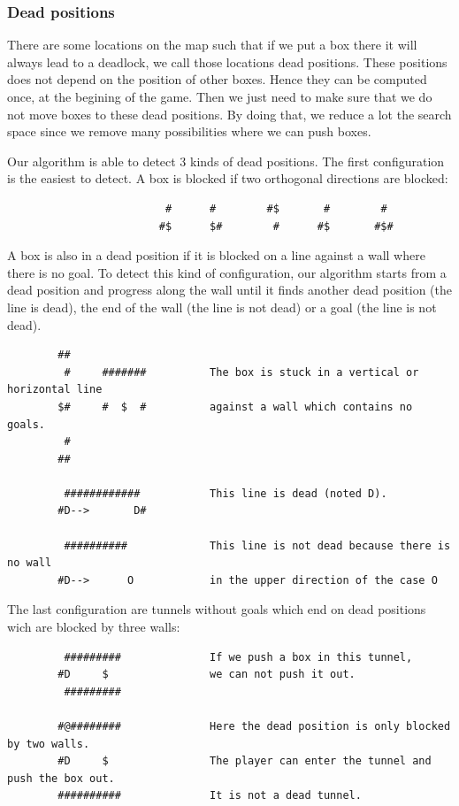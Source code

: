 \documentclass[a4paper,10pt]{article}
\begin{document}
          \subsubsection{Dead positions}
            There are some locations on the map such that if we put a box there it will always lead to a deadlock, we call those locations dead positions.  
			These positions does not depend on the position of other boxes.
			Hence they can be computed once, at the begining of the game.
            Then we just need to make sure that we do not move boxes to these dead positions. 
            By doing that, we reduce a lot the search space since we remove many possibilities where we can push boxes.
			

			Our algorithm is able to detect 3 kinds of dead positions.
			The first configuration is the easiest to detect. A box is blocked if two orthogonal directions are blocked:
            \begin{verbatim}
			             #      #        #$       #        #       
			            #$      $#        #      #$       #$# 
			\end{verbatim}

			A box is also in a dead position if it is blocked on a line against a wall where there is no goal.
			To detect this kind of configuration, our algorithm starts from a dead position and progress along the wall until it finds
			another dead position (the line is dead), the end of the wall (the line is not dead) or a goal (the line is not dead).
		\begin{verbatim}
		##           
		 #     #######          The box is stuck in a vertical or horizontal line
		$#     #  $  #          against a wall which contains no goals.
		 #
		##

		 ############           This line is dead (noted D).
		#D-->       D#
		 
		 ##########             This line is not dead because there is no wall 
		#D-->      O            in the upper direction of the case O
	    \end{verbatim}

			The last configuration are tunnels without goals which end on dead positions wich are blocked by three walls:
		\begin{verbatim}
		 #########              If we push a box in this tunnel, 
		#D     $                we can not push it out.
		 #########

		#@########              Here the dead position is only blocked by two walls. 
		#D     $                The player can enter the tunnel and push the box out. 
		##########              It is not a dead tunnel.
		\end{verbatim}
\end{document}
